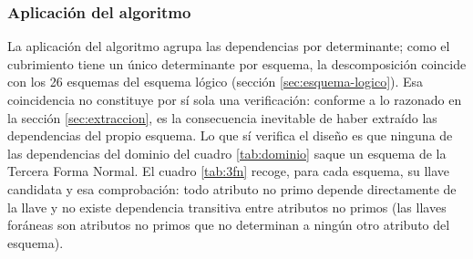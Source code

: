 \documentclass[11pt,a4paper]{article}
\begin{document}
\subsubsection{Aplicación del algoritmo}
La aplicación del algoritmo agrupa las dependencias por determinante; como el cubrimiento tiene un único determinante por esquema, la descomposición coincide con los 26 esquemas del esquema lógico (sección \ref{sec:esquema-logico}). Esa coincidencia no constituye por sí sola una verificación: conforme a lo razonado en la sección \ref{sec:extraccion}, es la consecuencia inevitable de haber extraído las dependencias del propio esquema. Lo que sí verifica el diseño es que ninguna de las dependencias del dominio del cuadro \ref{tab:dominio} saque un esquema de la Tercera Forma Normal. El cuadro \ref{tab:3fn} recoge, para cada esquema, su llave candidata y esa comprobación: todo atributo no primo depende directamente de la llave y no existe dependencia transitiva entre atributos no primos (las llaves foráneas son atributos no primos que no determinan a ningún otro atributo del esquema).
\end{document}
